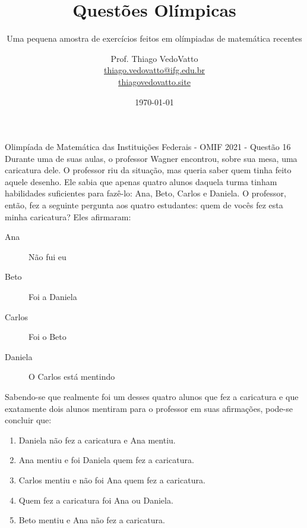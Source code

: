 \documentclass[10pt,aspectratio=169]{beamer}
\begin{document}
\title{Questões Olímpicas}
\subtitle{Uma pequena amostra de exercícios feitos em olímpiadas de matemática recentes}
\date{\today}
\author[Thiago VedoVatto]{Prof. Thiago VedoVatto\\\scriptsize{
		\href{mailto:thiago.vedovatto@ifg.edu.br}{thiago.vedovatto@ifg.edu.br}\\
		\url{thiagovedovatto.site}	
}}

\frame{\titlepage}

\begin{frame}[t]
	\small
	\begin{exercicio}{Olimpíada de Matemática das Instituições Federais - OMIF 2021 - Questão 16} Durante uma de suas aulas, o professor Wagner encontrou, sobre sua mesa, uma caricatura dele.
	O professor riu da situação, mas queria saber quem tinha feito aquele desenho.
	Ele sabia que apenas quatro alunos daquela turma tinham habilidades suficientes para fazê-lo: Ana, Beto, Carlos e Daniela.
	O professor, então, fez a seguinte pergunta aos quatro estudantes: quem de vocês fez esta minha caricatura? Eles afirmaram:
	\begin{description}
		\item[Ana] Não fui eu
		\item[Beto] Foi a Daniela
		\item[Carlos] Foi o Beto
		\item[Daniela] O Carlos está mentindo
	\end{description}
	Sabendo-se que realmente foi um desses quatro alunos que fez a caricatura e que exatamente dois alunos mentiram para o professor em suas afirmações, pode-se concluir que:
	\begin{enumerate}[a]
		\item Daniela não fez a caricatura e Ana mentiu.
		\item Ana mentiu e foi Daniela quem fez a caricatura.
		\item Carlos mentiu e não foi Ana quem fez a caricatura.
		\item Quem fez a caricatura foi Ana ou Daniela.
		\item Beto mentiu e Ana não fez a caricatura.
	\end{enumerate}
	\end{exercicio}
\end{frame}
\end{document}
